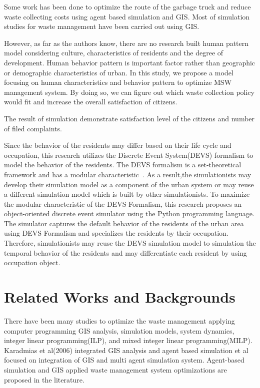 \documentclass{scsSimAUDPaperFormat}
\begin{document}
Some work has been done to optimize the route of the garbage truck and reduce waste collecting costs using agent based simulation and GIS\cite{dyson2005forecasting}\cite{}. Most of simulation studies for waste management have been carried out using GIS.



However, as far as the authors know, there are no research built human pattern model considering culture, characteristics of residents and the degree of development. Human behavior pattern is important factor rather than geographic or demographic characteristics of urban.
In this study, we propose a model focusing on human characteristics and behavior pattern to optimize MSW management system. By doing so, we can figure out which waste collection policy would fit and increase the overall satisfaction of citizens. 

The result of simulation demonstrate satisfaction level of the citizens and number of filed complaints.

Since the behavior of the residents may differ based on their life cycle and occupation, this research utilizes the Discrete Event System(DEVS) formalism to model the behavior of the residents. The DEVS formalism
is a set-theoretical framework and has a modular characteristic~\cite{Zeigler84, Zeigler90, tms2000}. As a result,the simulationists may develop their simulation model as a component of the urban system or may reuse a different simulation model which is built by other simulationists. 
To maximize the modular characteristic of the DEVS Formalism, this research proposes an object-oriented discrete event simulator using the Python programming language. The simulator captures the default behavior of the residents of the urban area using DEVS Formalism and specializes the residents by their occupation. Therefore, simulationists may reuse the DEVS simulation model to simulation the temporal behavior of the residents and may differentiate each resident by using occupation object. 

\section{Related Works and Backgrounds}

There have been many studies to optimize the waste management applying computer programming GIS analysis, simulation models, system dynamics, integer linear programming(ILP), and mixed integer linear programming(MILP).
Karadmias et al(2006)\cite{karadimas2006coupling} integrated GIS analysis and agent based simulation
et al 
\cite{karadimas2006coupling} focused on integration of GIS and multi agent simulation system. 
Agent-based simulation and GIS applied waste management system optimizations are proposed in the literature. \cite{karadimas2006coupling,shi2013multi,nguyenemission,nambiar2013multi,hua2016towards}
\end{document}
